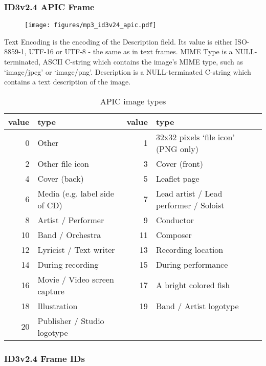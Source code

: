 \pagebreak

\subsubsection{ID3v2.4 APIC Frame}
\begin{figure}[h]
\texttt{[image: figures/mp3\_id3v24\_apic.pdf]}
\end{figure}
\par
\noindent
Text Encoding is the encoding of the Description field.
Its value is either ISO-8859-1, UTF-16 or UTF-8 - the same as in
text frames.
MIME Type is a NULL-terminated, ASCII C-string which contains the
image's MIME type, such as `image/jpeg' or `image/png'.
Description is a NULL-terminated C-string which contains
a text description of the image.
\begin{table}[h]
{
\begin{tabular}{|r|l||r|l|}
\hline
value & type & value & type \\
\hline
0 & Other & 1 & 32x32 pixels `file icon' (PNG only) \\
2 & Other file icon & 3 & Cover (front) \\
4 & Cover (back) & 5 & Leaflet page \\
6 & Media (e.g. label side of CD) & 7 & Lead artist / Lead performer / Soloist \\
8 & Artist / Performer & 9 & Conductor \\
10 & Band / Orchestra & 11 & Composer \\
12 & Lyricist / Text writer & 13 & Recording location \\
14 & During recording & 15 & During performance \\
16 & Movie / Video screen capture & 17 & A bright colored fish \\
18 & Illustration & 19 & Band / Artist logotype \\
20 & Publisher / Studio logotype & &  \\
\hline
\end{tabular}
\caption{APIC image types}
}
\end{table}

\pagebreak

\subsubsection{ID3v2.4 Frame IDs}

